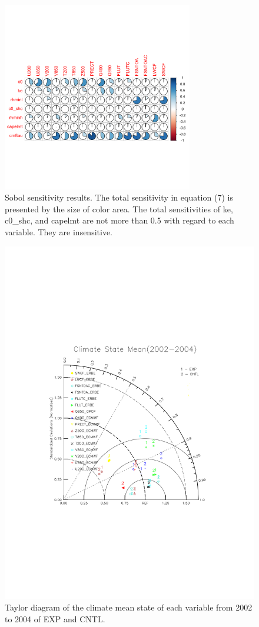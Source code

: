\documentclass[gmd, manuscript]{copernicus}
\begin{document}
\begin{figure}[t]
\includegraphics[width=8.3cm]{Sobol}
\caption{Sobol sensitivity results. The total sensitivity in equation (7) is presented by the size of color area. The total sensitivities of ke, c0\_shc, and capelmt are not more than 0.5 with regard to each variable. They are insensitive.}
\end{figure}

\begin{figure}[t]
\includegraphics[width=12cm]{taylor}
\caption{Taylor diagram of the climate mean state of each variable from 2002 to 2004 of EXP and CNTL.}
\end{figure}
\end{document}
